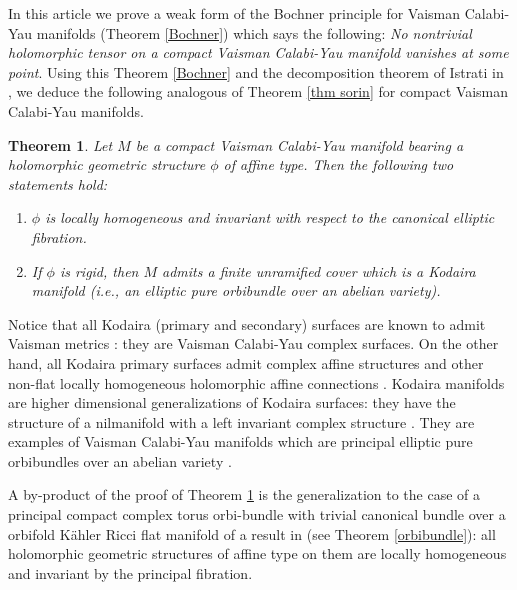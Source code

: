 \documentclass[12pt,reqno]{amsart}
\newtheorem{theorem}{Theorem}[section]
\theoremstyle{definition}
\numberwithin{equation}{section}
\begin{document}
In this article we prove a weak form of the Bochner principle for Vaisman Calabi-Yau manifolds (Theorem 
\ref{Bochner}) which says the following: {\it No nontrivial holomorphic tensor on a compact Vaisman 
Calabi-Yau manifold vanishes at some point}. Using this Theorem \ref{Bochner} and the decomposition theorem 
of Istrati in \cite{Is}, we deduce the following analogous of Theorem \ref{thm sorin} for compact Vaisman 
Calabi-Yau manifolds.

\begin{theorem} \label{Vaisman}
Let $M$ be a compact Vaisman Calabi-Yau manifold bearing a holomorphic geometric structure $\phi$
of affine type. Then the following two statements hold:
\begin{enumerate}
\item $\phi$ is locally homogeneous and invariant with respect to the canonical elliptic fibration.

\item If $\phi$ is rigid, then $M$ admits a finite unramified cover which
is a Kodaira manifold (i.e., an elliptic pure orbibundle over an abelian variety).
\end{enumerate}
\end{theorem} 

Notice that all Kodaira (primary and secondary) surfaces are known to admit Vaisman metrics \cite{Bel}: 
they are Vaisman Calabi-Yau complex surfaces. On the other hand, all Kodaira primary surfaces admit complex 
affine structures and other non-flat locally homogeneous holomorphic affine connections \cite{IKO, Vi}. 
Kodaira manifolds are higher dimensional generalizations of Kodaira surfaces: they have the structure of a 
nilmanifold with a left invariant complex structure \cite{GMPN}. They are examples of Vaisman Calabi-Yau 
manifolds which are principal elliptic pure orbibundles over an abelian variety \cite[Examples 7.2]{Is}.

A by-product of the proof of Theorem \ref{Vaisman} is the generalization to the case of a principal compact 
complex torus orbi-bundle with trivial canonical bundle over a orbifold K\"ahler Ricci flat manifold of a 
result in \cite{BD2} (see Theorem \ref{orbibundle}): all holomorphic geometric structures of affine type on 
them are locally homogeneous and invariant by the principal fibration.
\end{document}
